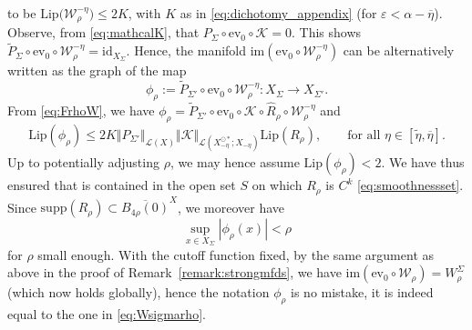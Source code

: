 \documentclass[a4paper, 12pt, oneside, reqno, notitlepage]{amsart}
\theoremstyle{plain}
\theoremstyle{definition}
\theoremstyle{remark}
\newcommand{\im}{\mathrm{im}}
\newcommand{\lip}{\mathrm{Lip}}
\begin{document}
to be $\lip\big( \mathcal{W}^{-\eta}_\rho\big)\leq 2K$,
with $K$ as in \eqref{eq:dichotomy_appendix} (for $\varepsilon < \alpha - \overline{\eta}$).
Observe, from \eqref{eq:mathcalK}, that $P_\Sigma \circ \mathrm{ev}_0  \circ \mathcal{K} = 0$.
This shows $\widetilde{P}_\Sigma \circ\mathrm{ev}_0 \circ \mathcal{W}_\rho^{-\eta} = \mathrm{id}_{X_\Sigma}$.
Hence, the manifold $\im(\mathrm{ev}_0 \circ \mathcal{W}^{-\eta}_\rho)$ can be alternatively written as the graph of the map
\begin{equation}
    \phi_\rho :=\widetilde{P}_{\Sigma'} \circ\mathrm{ev}_0 \circ \mathcal{W}^{-\eta}_\rho:X_\Sigma \to X_{\Sigma'}.
    \label{eq:phirho}
\end{equation}
From \eqref{eq:FrhoW}, we have  $\phi_\rho = \widetilde{P}_{\Sigma'} \circ\mathrm{ev}_0 \circ \mathcal{K} \circ \widehat{R}_\rho \circ \mathcal{W}_\rho^{-\eta}$ and
\begin{equation}
    \lip(\phi_\rho) \leq 2K \Vert P_{\Sigma'}\Vert_{\mathcal{L}(X)} \Vert \mathcal{K} \Vert_{\mathcal{L}(X_{-\eta}^{\odot *};X_{-\eta})} \lip(R_\rho), \qquad \text{for all } \eta \in [\widetilde{\eta},\overline{\eta}].
    \label{eq:lipphirho}
\end{equation}
Up to potentially adjusting $\rho$, we may hence assume $\lip(\phi_\rho) < 2$.
We have thus ensured that 
is contained in the open set $S$ on which $R_\rho$ is $C^k$ \eqref{eq:smoothnessset}. 
Since $\mathrm{supp}(R_\rho) \subset \overline{B_{4\rho}(0)}^X$, we moreover have
\begin{equation}
    \sup_{x \in X_\Sigma} |\phi_\rho(x)| < \rho
    \label{eq:phirhomax}
\end{equation}
for $\rho$ small enough.
With the cutoff function fixed, by the same argument as above in the proof of Remark~\ref{remark:strongmfds}, we have $\im(\mathrm{ev}_0 \circ \mathcal{W}_\rho) = W^\Sigma_\rho$ (which now holds globally), hence the notation $\phi_\rho$ is no mistake, it is indeed equal to the one in \eqref{eq:Wsigmarho}.
\end{document}
